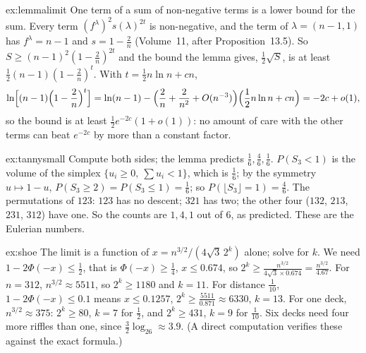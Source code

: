 \begin{solution}{ex:lemmalimit}
\idea One term of a sum of non-negative terms is a lower bound for the sum.
\writeup Every term $(f^\lambda)^2s(\lambda)^{2t}$ is non-negative, and the term of $\lambda=(n-1,1)$ has $f^\lambda=n-1$ and $s=1-\frac2n$ (Volume~11, after Proposition~13.5). So $S\ge(n-1)^2(1-\frac2n)^{2t}$ and the bound
the lemma gives, $\frac12\sqrt S$, is at least $\frac12(n-1)(1-\frac2n)^t$. With $t=\frac12n\ln n+cn$,
\[
\ln\Bigl[(n-1)\Bigl(1-\frac2n\Bigr)^t\Bigr]=\ln(n-1)-\Bigl(\frac2n+\frac2{n^2}+O(n^{-3})\Bigr)\Bigl(\frac12n\ln n+cn\Bigr)=-2c+o(1),
\]
so the bound is at least $\frac12e^{-2c}(1+o(1))$: no amount of care with the other terms can beat $e^{-2c}$ by more than a constant factor.
\end{solution}

\begin{solution}{ex:tannysmall}
\idea Compute both sides; the lemma predicts $\frac16,\frac46,\frac16$.
\writeup $P(S_3<1)$ is the volume of the simplex $\{u_i\ge0,\ \sum u_i<1\}$, which is $\frac16$; by the symmetry $u\mapsto1-u$, $P(S_3\ge2)=P(S_3\le1)=\frac16$; so $P(\lfloor S_3\rfloor=1)=\frac46$. The permutations
of $123$: $123$ has no descent; $321$ has two; the other four ($132$, $213$, $231$, $312$) have one. So the counts are $1,4,1$ out of $6$, as predicted. These are the Eulerian numbers.
\end{solution}

\begin{solution}{ex:shoe}
\idea The limit is a function of $x=n^{3/2}/(4\sqrt3\,2^k)$ alone; solve for $k$.
\writeup We need $1-2\Phi(-x)\le\frac12$, that is $\Phi(-x)\ge\frac14$, $x\le0.674$, so $2^k\ge\frac{n^{3/2}}{4\sqrt3\times0.674}=\frac{n^{3/2}}{4.67}$. For $n=312$, $n^{3/2}\approx5511$, so $2^k\ge1180$ and $k=11$. For
distance $\frac1{10}$, $1-2\Phi(-x)\le0.1$ means $x\le0.1257$, $2^k\ge\frac{5511}{0.871}\approx6330$, $k=13$. For one deck, $n^{3/2}\approx375$: $2^k\ge80$, $k=7$ for $\frac12$, and $2^k\ge431$, $k=9$ for $\frac1{10}$. Six decks need four more riffles
than one, since $\frac32\log_26\approx3.9$. (A direct computation verifies these against the exact formula.)
\end{solution}

